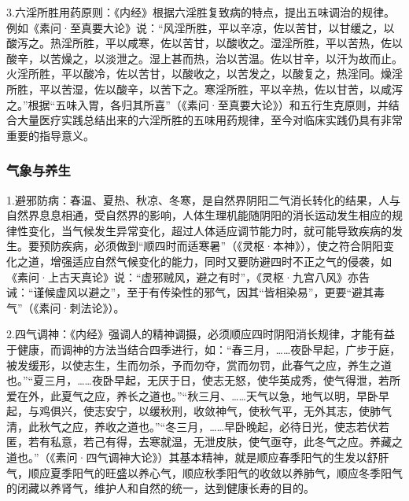 \documentclass[draft,12pt]{ctexbook}
\begin{document}
3.六淫所胜用药原则：《内经》根据六淫胜复致病的特点，提出五味调治的规律。例如《素问·至真要大论》说：“风淫所胜，平以辛凉，佐以苦甘，以甘缓之，以酸泻之。热淫所胜，平以咸寒，佐以苦甘，以酸收之。湿淫所胜，平以苦热，佐以酸辛，以苦燥之，以淡泄之。湿上甚而热，治以苦温。佐以甘辛，以汗为故而止。火淫所胜，平以酸冷，佐以苦甘，以酸收之，以苦发之，以酸复之，热淫同。燥淫所胜，平以苦湿，佐以酸辛，以苦下之。寒淫所胜，平以辛热，佐以甘苦，以咸泻之。”根据“五味入胃，各归其所喜”（《素问·至真要大论》）和五行生克原则，并结合大量医疗实践总结出来的六淫所胜的五味用药规律，至今对临床实践仍具有非常重要的指导意义。

\subsubsection{气象与养生}%

1.避邪防病：春温、夏热、秋凉、冬寒，是自然界阴阳二气消长转化的结果，人与自然界息息相通，受自然界的影响，人体生理机能随阴阳的消长运动发生相应的规律性变化，当气候发生异常变化，超过人体适应调节能力时，就可能导致疾病的发生。要预防疾病，必须做到“顺四时而适寒暑”（《灵枢·本神》），使之符合阴阳变化之道，增强适应自然气候变化的能力，同时又要防避四时不正之气的侵袭，如《素问·上古天真论》说：“虚邪贼风，避之有时”，《灵枢·九宫八风》亦告诫：“谨候虚风以避之”，至于有传染性的邪气，因其“皆相染易”，更要“避其毒气”（《素问·刺法论》）。

2.四气调神：《内经》强调人的精神调摄，必须顺应四时阴阳消长规律，才能有益于健康，而调神的方法当结合四季进行，如：“春三月，……夜卧早起，广步于庭，被发缓形，以使志生，生而勿杀，予而勿夺，赏而勿罚，此春气之应，养生之道也。”“夏三月，……夜卧早起，无厌于日，使志无怒，使华英成秀，使气得泄，若所爱在外，此夏气之应，养长之道也。”“秋三月、……天气以急，地气以明，早卧早起，与鸡俱兴，使志安宁，以缓秋刑，收敛神气，使秋气平，无外其志，使肺气清，此秋气之应，养收之道也。”“冬三月，……早卧晚起，必待日光，使志若伏若匿，若有私意，若己有得，去寒就温，无泄皮肤，使气亟夺，此冬气之应。养藏之道也。”（《素问·四气调神大论》）其基本精神，就是顺应春季阳气的生发以舒肝气，顺应夏季阳气的旺盛以养心气，顺应秋季阳气的收敛以养肺气，顺应冬季阳气的闭藏以养肾气，维护人和自然的统一，达到健康长寿的目的。

\ifx \allfiles \undefined
\end{document}
